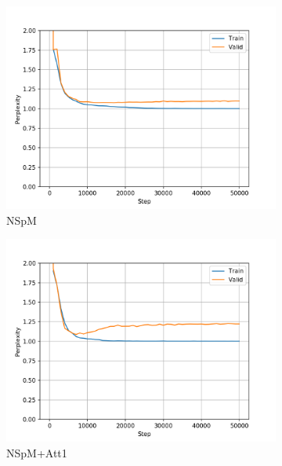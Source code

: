 \begin{figure}[h]
\centering
\begin{subfigure}{0.3\textwidth}
\includegraphics[width=\textwidth]{../results/monument_600/run1/neural_sparql_machine/ppls.png} 
\caption{NSpM}
\label{fig:monu600 nsm ppl}
\end{subfigure}
\hfill
\begin{subfigure}{0.3\textwidth}
\includegraphics[width=\textwidth]{../results/monument_600/run1/neural_sparql_machine_bahdanau_attention/ppls.png}
\caption{NSpM+Att1}
\label{fig:monu600 nsmbah ppl}
\end{subfigure}
\hfill
\begin{subfigure}{0.3\textwidth}

\end{subfigure}
\end{figure}
